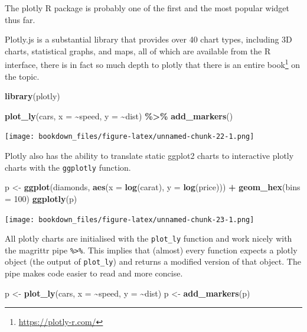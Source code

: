 \documentclass[
]{krantz}
\makeatletter
\newenvironment{Shaded}{\begin{snugshade}}{\end{snugshade}}
\newcommand{\DataTypeTok}[1]{\textcolor[rgb]{0.27,0.27,0.27}{#1}}
\newcommand{\DecValTok}[1]{\textcolor[rgb]{0.06,0.06,0.06}{#1}}
\newcommand{\KeywordTok}[1]{\textcolor[rgb]{0.27,0.27,0.27}{\textbf{#1}}}
\newcommand{\NormalTok}[1]{#1}
\newcommand{\OperatorTok}[1]{\textcolor[rgb]{0.43,0.43,0.43}{\textbf{#1}}}
\newcommand{\StringTok}[1]{\textcolor[rgb]{0.5,0.5,0.5}{#1}}
\renewcommand{\href}[2]{#2\footnote{\url{#1}}}
\newenvironment{kframe}{%
\medskip{}
\setlength{\fboxsep}{.8em}
 \def\at@end@of@kframe{}%
 \ifinner\ifhmode%
  \def\at@end@of@kframe{\end{minipage}}%
  \begin{minipage}{\columnwidth}%
 \fi\fi%
 \def\FrameCommand##1{\hskip\@totalleftmargin \hskip-\fboxsep
 \colorbox{shadecolor}{##1}\hskip-\fboxsep
     \hskip-\linewidth \hskip-\@totalleftmargin \hskip\columnwidth}%
 \MakeFramed {\advance\hsize-\width
   \@totalleftmargin\z@ \linewidth\hsize
   \@setminipage}}%
 {\par\unskip\endMakeFramed%
 \at@end@of@kframe}
\renewenvironment{Shaded}{\begin{kframe}}{\end{kframe}}
\makeatother
\begin{document}
The plotly \citep{R-plotly} R package is probably one of the first and the most popular widget thus far.

Plotly.js is a substantial library that provides over 40 chart types, including 3D charts, statistical graphs, and maps, all of which are available from the R interface, there is in fact so much depth to plotly that there is an entire \href{https://plotly-r.com/}{book} on the topic.

\begin{Shaded}
\begin{Highlighting}[]
\KeywordTok{library}\NormalTok{(plotly)}

\KeywordTok{plot\_ly}\NormalTok{(cars, }\DataTypeTok{x =} \OperatorTok{\textasciitilde{}}\NormalTok{speed, }\DataTypeTok{y =} \OperatorTok{\textasciitilde{}}\NormalTok{dist) }\OperatorTok{\%\textgreater{}\%}\StringTok{ }
\StringTok{  }\KeywordTok{add\_markers}\NormalTok{()}
\end{Highlighting}
\end{Shaded}

\texttt{[image: bookdown\_files/figure-latex/unnamed-chunk-22-1.png]}

Plotly also has the ability to translate static ggplot2 \citep{R-ggplot2} charts to interactive plotly charts with the \texttt{ggplotly} function.

\begin{Shaded}
\begin{Highlighting}[]
\NormalTok{p \textless{}{-}}\StringTok{ }\KeywordTok{ggplot}\NormalTok{(diamonds, }\KeywordTok{aes}\NormalTok{(}\DataTypeTok{x =} \KeywordTok{log}\NormalTok{(carat), }\DataTypeTok{y =} \KeywordTok{log}\NormalTok{(price))) }\OperatorTok{+}\StringTok{ }
\StringTok{  }\KeywordTok{geom\_hex}\NormalTok{(}\DataTypeTok{bins =} \DecValTok{100}\NormalTok{)}
\KeywordTok{ggplotly}\NormalTok{(p)}
\end{Highlighting}
\end{Shaded}

\texttt{[image: bookdown\_files/figure-latex/unnamed-chunk-23-1.png]}

All plotly charts are initialised with the \texttt{plot\_ly} function and work nicely with the magrittr \citep{R-magrittr} pipe \texttt{\%\textgreater{}\%}. This implies that (almost) every function expects a plotly object (the output of \texttt{plot\_ly}) and returns a modified version of that object. The pipe makes code easier to read and more concise.

\begin{Shaded}
\begin{Highlighting}[]
\NormalTok{p \textless{}{-}}\StringTok{ }\KeywordTok{plot\_ly}\NormalTok{(cars, }\DataTypeTok{x =} \OperatorTok{\textasciitilde{}}\NormalTok{speed, }\DataTypeTok{y =} \OperatorTok{\textasciitilde{}}\NormalTok{dist) }
\NormalTok{p \textless{}{-}}\StringTok{ }\KeywordTok{add\_markers}\NormalTok{(p)}
\end{Highlighting}
\end{Shaded}
\end{document}
